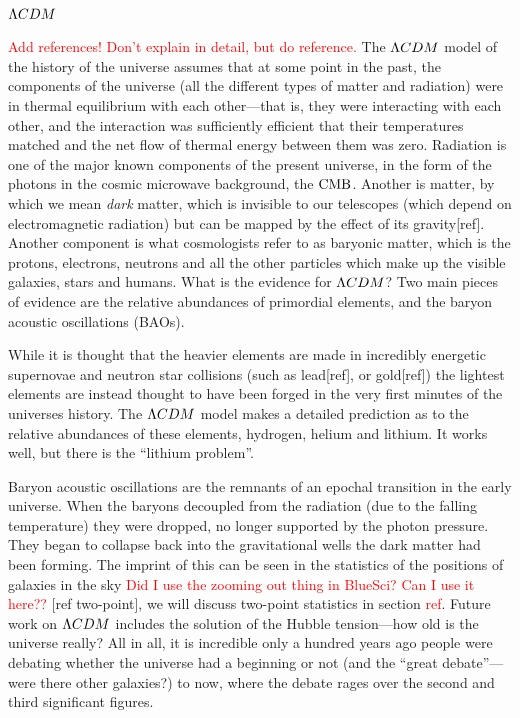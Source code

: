     \subsection{$\Lambda CDM$}
    \textcolor{red}{Add references! Don't explain in detail, but do reference.}
    The $\Lambda CDM$ model of the history of the universe assumes that at some point in the
    past, the components of the universe (all the different types of matter and radiation)
    were in thermal equilibrium with each other---that is, they were interacting with each other,
    and the interaction was sufficiently efficient that their temperatures matched
    and the net flow of thermal energy between them was zero.
\newpage
    Radiation is one of the major known components of the present universe, in the form of the
    photons in the cosmic microwave background, the $\text{CMB}$. Another is matter, by which we mean \textit{dark} matter,
    which is invisible to our telescopes (which depend on electromagnetic radiation) but can be mapped by the
    effect of its gravity[ref]. Another component is what cosmologists refer to as baryonic matter, which is
    the protons, electrons, neutrons and all the other particles which make up the visible galaxies, stars
    and humans.
\newpage
    What is the evidence for $\Lambda CDM$? Two main pieces of evidence are the relative abundances of
    primordial elements, and the baryon acoustic oscillations (BAOs).


    While it is thought that the heavier elements are made in incredibly energetic supernovae and
    neutron star collisions (such as lead[ref], or gold[ref]) the lightest elements are instead thought to have been forged in the
    very first minutes of the universes history. The $\Lambda CDM$ model makes a detailed prediction as to the
    relative abundances of these elements, hydrogen, helium and lithium. It works well, but there is
    the ``lithium problem''.


    Baryon acoustic oscillations are the remnants of an epochal transition in the early universe.
    When the baryons decoupled from the radiation (due to the falling temperature) they were dropped,
    no longer supported by the photon pressure. They began to collapse back into the gravitational
    wells the dark matter had been forming. The imprint of this can be seen in the statistics
    of the positions of galaxies in the sky \textcolor{red}{Did I use the zooming out thing in
    BlueSci? Can I use it here??} [ref two-point], we will discuss two-point statistics in
    section \textcolor{red}{ref}.
\newpage
    Future work on $\Lambda CDM$ includes the solution of the Hubble tension---how old is the universe really?
    All in all, it is incredible only a hundred years ago people were debating whether the universe had a beginning or not
    (and the ``great debate''---were there other galaxies?) to now, where the debate rages over the second and third significant
    figures.
\newpage
